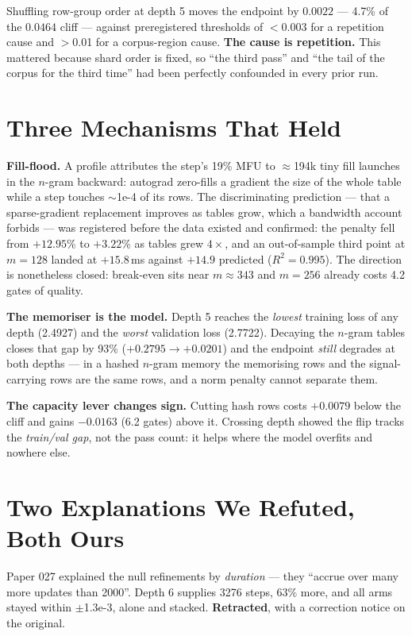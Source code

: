 \documentclass{article}
\begin{document}
Shuffling row-group order at depth 5 moves the endpoint by $0.0022$ --- 4.7\% of the $0.0464$ cliff --- against preregistered thresholds of $<$0.003 for a repetition cause and $>$0.01 for a corpus-region cause. \textbf{The cause is repetition.} This mattered because shard order is fixed, so ``the third pass'' and ``the tail of the corpus for the third time'' had been perfectly confounded in every prior run.

\section{Three Mechanisms That Held}
\textbf{Fill-flood.} A profile attributes the step's 19\% MFU to $\approx$194k tiny fill launches in the $n$-gram backward: autograd zero-fills a gradient the size of the whole table while a step touches $\sim$1e-4 of its rows. The discriminating prediction --- that a sparse-gradient replacement improves as tables grow, which a bandwidth account forbids --- was registered before the data existed and confirmed: the penalty fell from $+12.95$\% to $+3.22$\% as tables grew $4\times$, and an out-of-sample third point at $m{=}128$ landed at $+15.8$\,ms against $+14.9$ predicted ($R^2{=}0.995$). The direction is nonetheless closed: break-even sits near $m{\approx}343$ and $m{=}256$ already costs 4.2 gates of quality.

\textbf{The memoriser is the model.} Depth 5 reaches the \emph{lowest} training loss of any depth (2.4927) and the \emph{worst} validation loss (2.7722). Decaying the $n$-gram tables closes that gap by 93\% ($+0.2795 \to +0.0201$) and the endpoint \emph{still} degrades at both depths --- in a hashed $n$-gram memory the memorising rows and the signal-carrying rows are the same rows, and a norm penalty cannot separate them.

\textbf{The capacity lever changes sign.} Cutting hash rows costs $+0.0079$ below the cliff and gains $-0.0163$ (6.2 gates) above it. Crossing depth showed the flip tracks the \emph{train/val gap}, not the pass count: it helps where the model overfits and nowhere else.

\section{Two Explanations We Refuted, Both Ours}
Paper 027 explained the null refinements by \emph{duration} --- they ``accrue over many more updates than 2000''. Depth 6 supplies 3276 steps, 63\% more, and all arms stayed within $\pm$1.3e-3, alone and stacked. \textbf{Retracted}, with a correction notice on the original.
\end{document}
